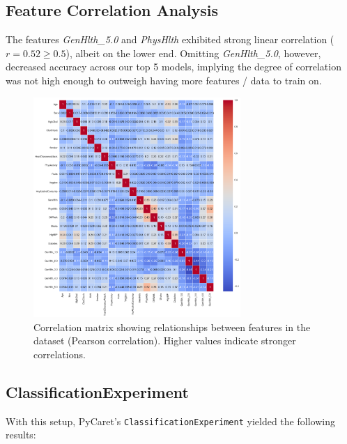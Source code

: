 \documentclass[a4paper,12pt]{article}
\begin{document}
\subsection{Feature Correlation Analysis}
The features \textit{GenHlth\_5.0} and \textit{PhysHlth} exhibited strong linear correlation ($r = 0.52 \geq 0.5$),
albeit on the lower end. Omitting \textit{GenHlth\_5.0}, however, decreased accuracy across our top 5 models,
implying the degree of correlation was not high enough to outweigh having more features / data to train 
on.

\begin{figure}[H]
    \centering
    \includegraphics[width=0.7\textwidth]{correlation_matrix.png}
    \caption{Correlation matrix showing relationships between features in the dataset (Pearson correlation). 
    Higher values indicate stronger correlations.}
    \label{fig:correlation_matrix}
\end{figure}

\clearpage

\subsection{ClassificationExperiment}
With this setup, PyCaret's \texttt{ClassificationExperiment} yielded the following results:
\end{document}
